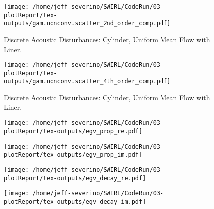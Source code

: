 \documentclass{article}
\begin{document}
%    
%    
%
 \begin{figure}
     \centering
     \texttt{[image: /home/jeff-severino/SWIRL/CodeRun/03-plotReport/tex-outputs/gam.nonconv.scatter\_2nd\_order\_comp.pdf]}
     \caption{Discrete Acoustic Disturbances: Cylinder, Uniform Mean Flow with Liner.}
 \end{figure}
 
 



 \begin{figure}
     \centering
     \texttt{[image: /home/jeff-severino/SWIRL/CodeRun/03-plotReport/tex-outputs/gam.nonconv.scatter\_4th\_order\_comp.pdf]}
     \caption{Discrete Acoustic Disturbances: Cylinder, Uniform Mean Flow with Liner.}
 \end{figure}
 
 


 \begin{figure}
     \centering
     \texttt{[image: /home/jeff-severino/SWIRL/CodeRun/03-plotReport/tex-outputs/egv\_prop\_re.pdf]}
 \end{figure}

 \begin{figure}
     \centering
     \texttt{[image: /home/jeff-severino/SWIRL/CodeRun/03-plotReport/tex-outputs/egv\_prop\_im.pdf]}
 \end{figure}

 \begin{figure}
     \centering
     \texttt{[image: /home/jeff-severino/SWIRL/CodeRun/03-plotReport/tex-outputs/egv\_decay\_re.pdf]}
 \end{figure}

 \begin{figure}
     \centering
     \texttt{[image: /home/jeff-severino/SWIRL/CodeRun/03-plotReport/tex-outputs/egv\_decay\_im.pdf]}
 \end{figure}
\end{document}
